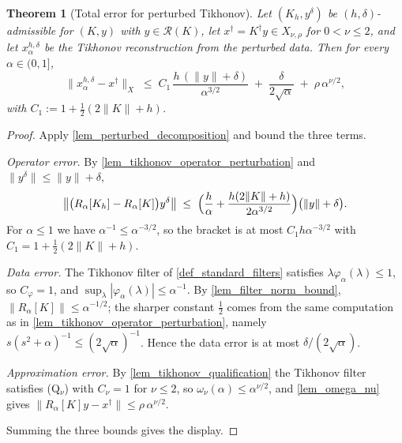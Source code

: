 \documentclass[a4paper]{report}
\theoremstyle{plain}
\newtheorem{theorem}{Theorem}[chapter]
\theoremstyle{definition}
\theoremstyle{remark}
\newcommand{\Ran}{\mathcal{R}}
\newcommand{\dg}{^{\dagger}}
\begin{document}
\begin{theorem}[Total error for perturbed Tikhonov]
  \label{thm_perturbed_total_error}
  Let $(K_h,y^{\delta})$ be $(h,\delta)$-admissible for $(K,y)$ with $y \in \Ran(K)$, let
  $x\dg = K\dg y \in X_{\nu,\rho}$ for $0 < \nu \le 2$, and let $x^{h,\delta}_{\alpha}$ be
  the Tikhonov reconstruction from the perturbed data.  Then for every
  $\alpha \in (0,1]$,
  \[
    \|x^{h,\delta}_{\alpha} - x\dg\|_X \;\le\;
      C_1\,\frac{h\,(\|y\|+\delta)}{\alpha^{3/2}}
      \;+\; \frac{\delta}{2\sqrt{\alpha}}
      \;+\; \rho\,\alpha^{\nu/2} ,
  \]
  with $C_1 := 1 + \tfrac{1}{2}(2\|K\|+h)$.
\end{theorem}
\begin{proof}
  Apply \cref{lem_perturbed_decomposition} and bound the three terms.

  \emph{Operator error.}  By \cref{lem_tikhonov_operator_perturbation} and
  $\|y^{\delta}\| \le \|y\|+\delta$,
  \[
    \bigl\|\bigl(R_{\alpha}[K_h]-R_{\alpha}[K]\bigr)y^{\delta}\bigr\|
      \;\le\; \Bigl(\frac{h}{\alpha}+\frac{h(2\|K\|+h)}{2\alpha^{3/2}}\Bigr)
        \bigl(\|y\|+\delta\bigr) .
  \]
  For $\alpha \le 1$ we have $\alpha^{-1} \le \alpha^{-3/2}$, so the bracket is at most
  $C_1 h\alpha^{-3/2}$ with $C_1 = 1+\tfrac{1}{2}(2\|K\|+h)$.

  \emph{Data error.}  The Tikhonov filter of \cref{def_standard_filters} satisfies
  $\lambda\varphi_{\alpha}(\lambda) \le 1$, so $C_{\varphi} = 1$, and
  $\sup_{\lambda}|\varphi_{\alpha}(\lambda)| \le \alpha^{-1}$.  By
  \cref{lem_filter_norm_bound}, $\|R_{\alpha}[K]\| \le \alpha^{-1/2}$; the sharper
  constant $\tfrac{1}{2}$ comes from the same computation as in
  \cref{lem_tikhonov_operator_perturbation}, namely
  $s(s^{2}+\alpha)^{-1} \le (2\sqrt{\alpha})^{-1}$.  Hence the data error is at most
  $\delta/(2\sqrt{\alpha})$.

  \emph{Approximation error.}  By \cref{lem_tikhonov_qualification} the Tikhonov filter
  satisfies (Q$_{\nu}$) with $C_{\nu} = 1$ for $\nu \le 2$, so
  $\omega_{\nu}(\alpha) \le \alpha^{\nu/2}$, and \cref{lem_omega_nu} gives
  $\|R_{\alpha}[K]y-x\dg\| \le \rho\,\alpha^{\nu/2}$.

  Summing the three bounds gives the display.
\end{proof}
\end{document}
